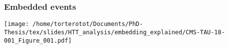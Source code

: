 \begin{frame}
\frametitle{Embedded events}
\begin{center}
\texttt{[image: /home/torterotot/Documents/PhD-Thesis/tex/slides/HTT\_analysis/embedding\_explained/CMS-TAU-18-001\_Figure\_001.pdf]}
\end{center}
\end{frame}